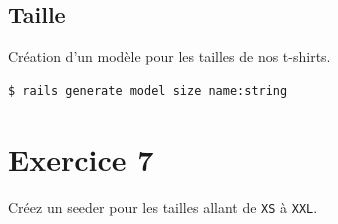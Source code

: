 \begin{english}

\begin{Shaded}
\begin{Highlighting}[]

  \NormalTok{ = }

\NormalTok{\textless{}\% }\OtherTok{ \%\textgreater{}}
\OtherTok{\textgreater{}}\OtherTok{\%\textgreater{}}\OtherTok{\textgreater{}}
\NormalTok{\textless{}\% }\OtherTok{ \%\textgreater{}}
\end{Highlighting}
\end{Shaded}

\end{english}

\hypertarget{taille}{%
\subsection{Taille}\label{taille}}

Création d'un modèle pour les tailles de nos t-shirts.

\begin{english}

\begin{verbatim}
$ rails generate model size name:string
\end{verbatim}

\end{english}

\hypertarget{exercice-7}{%
\section{Exercice 7}\label{exercice-7}}

Créez un seeder pour les tailles allant de \textenglish{\texttt{XS}} à
\textenglish{\texttt{XXL}}.

\begin{english}

\begin{Shaded}
\begin{Highlighting}[]
\NormalTok{$ }
\NormalTok{$ }
\NormalTok{$ }
\NormalTok{$ }

\NormalTok{$ }

\NormalTok{$ }
\OperatorTok{\textgreater{}} 
\end{Highlighting}
\end{Shaded}

\end{english}

